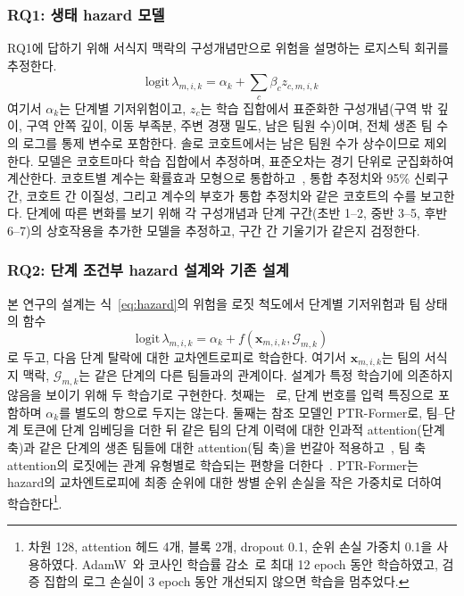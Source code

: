 \subsubsection{RQ1: 생태 hazard 모델}
\label{sec:method:rq1}
RQ1에 답하기 위해 서식지 맥락의 구성개념만으로 위험을 설명하는 로지스틱 회귀를 추정한다.
\begin{equation}
\mathrm{logit}\,\lambda_{m,i,k}=\alpha_k+\sum_{c}\beta_c z_{c,m,i,k}
\label{eq:ehm}
\end{equation}
여기서 $\alpha_k$는 단계별 기저위험이고, $z_c$는 학습 집합에서 표준화한 구성개념(구역 밖 깊이, 구역 안쪽 깊이, 이동 부족분, 주변 경쟁 밀도, 남은 팀원 수)이며, 전체 생존 팀 수의 로그를 통제 변수로 포함한다.
솔로 코호트에서는 남은 팀원 수가 상수이므로 제외한다.
모델은 코호트마다 학습 집합에서 추정하며, 표준오차는 경기 단위로 군집화하여 계산한다.
코호트별 계수는 확률효과 모형으로 통합하고~\cite{DerSimonian86}, 통합 추정치와 95\% 신뢰구간, 코호트 간 이질성, 그리고 계수의 부호가 통합 추정치와 같은 코호트의 수를 보고한다.
단계에 따른 변화를 보기 위해 각 구성개념과 단계 구간(초반 1--2, 중반 3--5, 후반 6--7)의 상호작용을 추가한 모델을 추정하고, 구간 간 기울기가 같은지 검정한다.

\subsubsection{RQ2: 단계 조건부 hazard 설계와 기존 설계}
\label{sec:method:rq2}
본 연구의 설계는 식~\eqref{eq:hazard}의 위험을 로짓 척도에서 단계별 기저위험과 팀 상태의 함수
\begin{equation}
\mathrm{logit}\,\lambda_{m,i,k}=\alpha_k+f(\mathbf{x}_{m,i,k},\mathcal{G}_{m,k})
\label{eq:logit}
\end{equation}
로 두고, 다음 단계 탈락에 대한 교차엔트로피로 학습한다.
여기서 $\mathbf{x}_{m,i,k}$는 팀의 서식지 맥락, $\mathcal{G}_{m,k}$는 같은 단계의 다른 팀들과의 관계이다.
설계가 특정 학습기에 의존하지 않음을 보이기 위해 두 학습기로 구현한다.
첫째는 ~\cite{Friedman01,Ke17}로, 단계 번호를 입력 특징으로 포함하며 $\alpha_k$를 별도의 항으로 두지는 않는다.
둘째는  참조 모델인 PTR-Former로, 팀--단계 토큰에 단계 임베딩을 더한 뒤 같은 팀의 단계 이력에 대한 인과적 attention(단계 축)과 같은 단계의 생존 팀들에 대한 attention(팀 축)을 번갈아 적용하고~\cite{Vaswani17}, 팀 축 attention의 로짓에는 관계 유형별로 학습되는 편향을 더한다~\cite{Ying21}.
PTR-Former는 hazard의 교차엔트로피에 최종 순위에 대한 쌍별 순위 손실을 작은 가중치로 더하여 학습한다\footnote{차원 128, attention 헤드 4개, 블록 2개, dropout 0.1, 순위 손실 가중치 0.1을 사용하였다. AdamW~\cite{LoshchilovAdamW}와 코사인 학습률 감소~\cite{LoshchilovSGDR}로 최대 12 epoch 동안 학습하였고, 검증 집합의 로그 손실이 3 epoch 동안 개선되지 않으면 학습을 멈추었다.}.

